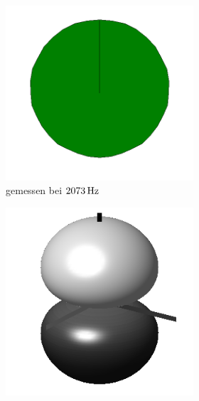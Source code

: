 \documentclass[numbers=noenddot,12pt,a4paper]{scrartcl}
\begin{document}
\begin{figure}[H]
	\centering
	\begin{subfigure}[h]{0.3\textwidth}
		\begin{subfigure}[b]{\textwidth}
			\includegraphics[width=\textwidth]{messwerte/2073Hzl1m0.png}
			\caption{gemessen bei $\unit[2073]{Hz}$} \label{img:l1m0}
		\end{subfigure}
		\begin{subfigure}[b]{\textwidth}
			\includegraphics[width=\textwidth]{Spherical_Harmonics_deg3l1m0.png}

\end{subfigure}
\end{subfigure}
\end{figure}
\end{document}
